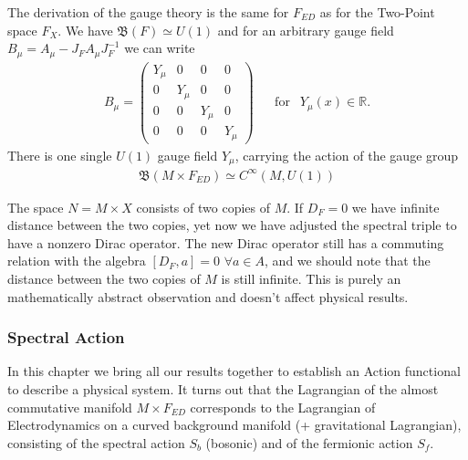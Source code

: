 The derivation of the gauge theory is the same for $F_{ED}$ as for the
Two-Point space $F_X$. We have $\mathfrak{B}(F) \simeq U(1)$ and for an
arbitrary gauge field $B_\mu = A_\mu - J_F A_\mu J_F^{-1}$ we can write
\begin{align} \label{field}
    B_\mu =
    \begin{pmatrix}
        Y_\mu & 0 & 0 & 0 \\
        0 & Y_\mu& 0 & 0 \\
        0 & 0 & Y_\mu& 0 \\
        0 & 0 & 0 & Y_\mu
    \end{pmatrix} \;\;\;\;\;\ \text{for} \;\;\ Y_\mu (x) \in \mathbb{R}.
\end{align}
There is one single $U(1)$ gauge field $Y_\mu$, carrying the action of the
gauge group
\begin{align}
   \text{$\mathfrak{B}$}(M\times F_{ED}) \simeq C^\infty(M, U(1))
\end{align}

The space $N = M\times X$ consists of two copies of $M$.
If $D_F = 0$ we have infinite distance between the two copies, yet now we have
adjusted the spectral triple to have a nonzero Dirac operator. The new
Dirac operator still has a commuting relation with the algebra $[D_F, a] = 0$
$\forall a \in A$, and we should note that the distance between the two
copies of $M$ is still infinite. This is purely an mathematically abstract
observation and doesn't affect physical results.

\subsubsection{Spectral Action}
In this chapter we bring all our results together to establish an
Action functional to describe a physical system. It turns out that
the Lagrangian of the almost commutative manifold $M\times F_{ED}$
corresponds to the Lagrangian of Electrodynamics on a curved
background manifold (+ gravitational Lagrangian), consisting of the spectral
action $S_b$ (bosonic) and of the fermionic action $S_f$.


